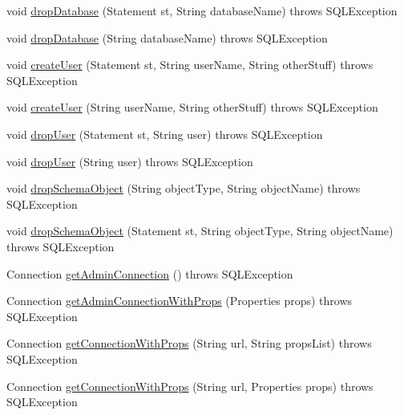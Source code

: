 \begin{DoxyCompactItemize}
\item 
void \mbox{\hyperlink{classtestsuite_1_1_base_test_case_a4f50d8b7e052b9a454a2edc5d4c73cfd}{drop\+Database}} (Statement st, String database\+Name)  throws S\+Q\+L\+Exception 
\item 
void \mbox{\hyperlink{classtestsuite_1_1_base_test_case_aaef6c7d74693cac4684e1fc34a35524b}{drop\+Database}} (String database\+Name)  throws S\+Q\+L\+Exception 
\item 
void \mbox{\hyperlink{classtestsuite_1_1_base_test_case_a572945638013e76cba6fa17a9e7f4ee5}{create\+User}} (Statement st, String user\+Name, String other\+Stuff)  throws S\+Q\+L\+Exception 
\item 
void \mbox{\hyperlink{classtestsuite_1_1_base_test_case_afd3a6d04fc70a7d2fbff92ed1e8cb01d}{create\+User}} (String user\+Name, String other\+Stuff)  throws S\+Q\+L\+Exception 
\item 
void \mbox{\hyperlink{classtestsuite_1_1_base_test_case_a977fa9542cf99aaec9354c7fa6b2a677}{drop\+User}} (Statement st, String user)  throws S\+Q\+L\+Exception 
\item 
void \mbox{\hyperlink{classtestsuite_1_1_base_test_case_a9a9d1bad807c93b02d0cdfda3b217195}{drop\+User}} (String user)  throws S\+Q\+L\+Exception 
\item 
void \mbox{\hyperlink{classtestsuite_1_1_base_test_case_a8778ffee4f5311ddcf9f34a431e65fd5}{drop\+Schema\+Object}} (String object\+Type, String object\+Name)  throws S\+Q\+L\+Exception 
\item 
void \mbox{\hyperlink{classtestsuite_1_1_base_test_case_a7c25fb4e0676e75d993648ef990ee28f}{drop\+Schema\+Object}} (Statement st, String object\+Type, String object\+Name)  throws S\+Q\+L\+Exception 
\item 
Connection \mbox{\hyperlink{classtestsuite_1_1_base_test_case_a5aac2df8b2b635a640bd2ca0f9df4f63}{get\+Admin\+Connection}} ()  throws S\+Q\+L\+Exception 
\item 
Connection \mbox{\hyperlink{classtestsuite_1_1_base_test_case_a1b9097dbfa04cb3fda0be74767ee8b02}{get\+Admin\+Connection\+With\+Props}} (Properties props)  throws S\+Q\+L\+Exception 
\item 
Connection \mbox{\hyperlink{classtestsuite_1_1_base_test_case_a6d4d784759272e95598bed255fe533fa}{get\+Connection\+With\+Props}} (String url, String props\+List)  throws S\+Q\+L\+Exception 
\item 
Connection \mbox{\hyperlink{classtestsuite_1_1_base_test_case_a63736613e1c2617aa290baa6ecadaf1b}{get\+Connection\+With\+Props}} (String url, Properties props)  throws S\+Q\+L\+Exception 

\end{DoxyCompactItemize}
